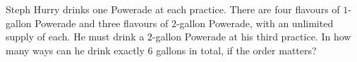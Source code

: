 Steph Hurry drinks one Powerade at each practice. There are four flavours of $1$-gallon Powerade and three flavours of $2$-gallon Powerade, with an unlimited supply of each. He must drink a $2$-gallon Powerade at his third practice. In how many ways can he drink exactly $6$ gallons in total, if the order matters?
